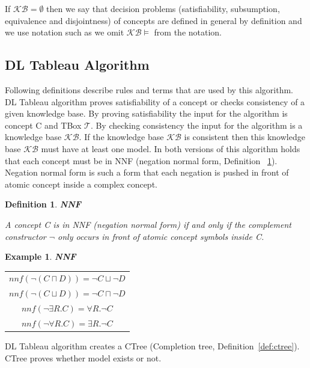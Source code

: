 \documentclass[12pt,a4paper]{article}
\newtheorem{definition}{Definition}[subsection]
\newtheorem{example}{Example}[subsection]
\begin{document}
If $\mathcal{KB} = \emptyset$ then we say that decision problems (satisfiability, subsumption, equivalence and disjointness) of concepts are defined in general by definition and we use notation such as we omit $\mathcal{KB} \models$ from the notation.

\subsection{DL Tableau Algorithm}
Following definitions \citep{baaderHandbook} describe rules and terms that are used by this algorithm. DL Tableau algorithm proves satisfiability of a concept or checks consistency of a given knowledge base. By proving satisfiability the input for the algorithm is concept C and TBox $\mathcal{T}$. By checking consistency the input for the algorithm is a knowledge base $\mathcal{KB}$. If the knowledge base $\mathcal{KB}$ is consistent then this knowledge base $\mathcal{KB}$ must have at least one model. In both versions of this algorithm holds that each concept must be in NNF (negation normal form, Definition ~\ref{def:nnf}). Negation normal form is such a form that each negation is pushed in front of atomic concept inside a complex concept. 

\begin{definition}{\textbf{NNF}}
	\label{def:nnf}
	
	A concept C is in NNF (negation normal form) if and only if the complement constructor $\neg$ only occurs in front of atomic concept symbols inside C.
\end{definition}

\begin{example}{\textbf{NNF}}
	\begin{table}[H]
		\centering
		\begin{tabular}{c}
			$ nnf(\neg (C \sqcap D)) = \neg C \sqcup \neg D $ \\
			\addlinespace[0.4cm]
			$ nnf(\neg (C \sqcup D)) = \neg C \sqcap \neg D $ \\
			\addlinespace[0.4cm]
			$ nnf(\neg \exists R.C) = \forall R. \neg C $ \\
			\addlinespace[0.4cm]
			$ nnf(\neg \forall R.C) = \exists R. \neg C $
		\end{tabular}
	\end{table}
	
\end{example}

DL Tableau algorithm creates a CTree (Completion tree, Definition~\ref{def:ctree}). CTree proves whether model exists or not.
\end{document}
